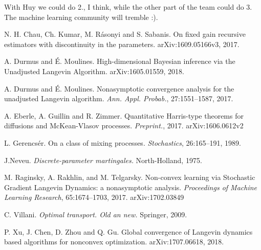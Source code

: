 \documentclass[a4paper,draft]{article}
\begin{document}
With Huy we could do 2., I think, while the other part of the team could do 3.
The machine learning community will tremble :).

\begin{thebibliography}{00}

 N. H. Chau, Ch. Kumar, M. R\'asonyi and S. Sabanis.
\newblock On fixed gain recursive estimators with discontinuity in the parameters.
\newblock arXiv:1609.05166v3, 2017.

 A. Durmus and \'E. Moulines.
\newblock High-dimensional Bayesian inference via the Unadjusted
Langevin Algorithm.
\newblock arXiv:1605.01559, 2018.

 A. Durmus and \'E. Moulines.
\newblock Nonasymptotic convergence analysis for the unadjusted Langevin algorithm.
\newblock \emph{Ann. Appl. Probab.}, 27:1551--1587, 2017.

 A. Eberle, A. Guillin and R. Zimmer.
\newblock Quantitative Harris-type theorems for diffusions and
McKean-Vlasov processes. \newblock\emph{Preprint.}, 2017.
\newblock arXiv:1606.0612v2

 L. Gerencs\'er.
\newblock On a class of mixing processes.
\newblock \emph{Stochastics},  26:165--191, 1989.

 J.Neveu.
\newblock\emph{Discrete-parameter martingales.}
\newblock North-Holland, 1975.

M. Raginsky, A. Rakhlin, and M. Telgarsky.
\newblock Non-convex learning via Stochastic Gradient Langevin Dynamics: a nonasymptotic analysis.
\newblock \emph{Proceedings of Machine Learning Research}, 65:1674--1703, 2017. \newblock arXiv:1702.03849

 C. Villani.
\newblock \emph{Optimal transport. Old an new.}
\newblock Springer, 2009.

 P. Xu, J. Chen, D. Zhou and Q. Gu.
\newblock Global convergence of Langevin dynamics based
algorithms for nonconvex optimization.
\newblock arXiv:1707.06618, 2018.

\end{thebibliography}
\end{document}
